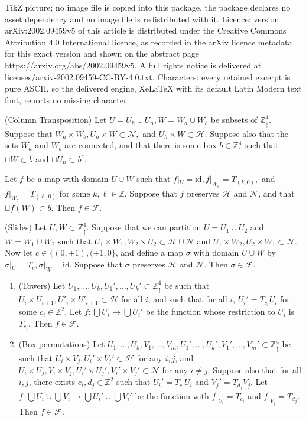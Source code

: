 \documentclass[10pt,a4paper]{amsart}
\newcommand{\X}{\times}
\newcommand{\Zd}{\mathds{Z}^4_\uparrow}
\newcommand{\Z}{\mathds{Z}}
\newcommand{\id}{\text{id}}
\newcommand{\scrF}{\mathcal{F}}
\newcommand{\scrH}{\mathcal{H}}
\newcommand{\scrN}{\mathcal{N}}
\newcommand{\sig}{\sigma}
\newcommand{\sset}{\subset}
\begin{document}
TikZ picture; no image file is copied into this package, the package declares no asset dependency and no image file is redistributed with it. Licence: version arXiv:2002.09459v5 of this article is distributed under the Creative Commons Attribution 4.0 International licence, as recorded in the arXiv licence metadata for this exact version and shown on the abstract page https://arxiv.org/abs/2002.09459v5. A full rights notice is delivered at licenses/arxiv-2002.09459-CC-BY-4.0.txt. Characters: every retained excerpt is pure ASCII, so the delivered engine, XeLaTeX with its default Latin Modern text font, reports no missing character.
\begin{prop}
	\label{P:basic-perm} (Column Transposition)
	Let
	$U = U_h \cup U_n, W = W_a \cup W_b$ be subsets of $\Zd$. Suppose that $W_a \X W_b, U_n \X W \sset \scrN,$ and $U_h \X W \sset \scrH$. Suppose also that the sets $W_a$ and $W_b$ are connected, and that there is some box $b \in \Zd$ such that $\sqcup W \sset b$ and $\sqcup U_n \sset b^c$.
	
	Let $f$ be a map with domain $U \cup W$ such that $f|_U = \id, f|_{W_a} = T_{(k, 0)},$ and $f|_{W_b} = T_{(\ell, 0)}$ for some $k, \ell \in \Z$. Suppose that $f$ preserves $\scrH$ and $\scrN$, and that $\sqcup f(W) \sset b$. Then $f \in \scrF$.
\end{prop}

\begin{prop}
	\label{P:slides} (Slides)
	Let $U, W \sset \Zd$. Suppose that we can partition $U = U_1 \cup U_2$ and $W = W_1 \cup W_2$ such that $U_1 \X W_1, W_2 \X U_2 \sset \scrH \cup \scrN$ and $U_1 \X W_2, U_2 \X W_1 \sset \scrN$. Now let $c \in \{(0, \pm 1), (\pm 1, 0\}$, and define a map $\sig$ with domain $U \cup W$ by  $\sig|_U = T_c, \sig|_W = \id$. Suppose that $\sig$ preserves $\scrH$ and $\scrN$. Then $\sig \in \scrF$.
\end{prop}

\begin{prop}
	\label{P:lie-in-F}
	\begin{enumerate}
		\item (Towers) Let $U_1, \dots, U_k, U_1', \dots, U_k' \sset \Zd$ be such that $U_i \X U_{i+1}, U'_i \X U'_{i+1} \sset \scrH$ for all $i$, and such that for all $i$, $U_i' = T_{c_i} U_i$ for some $c_i \in \Z^2$. Let $f:\bigcup U_i \to \bigcup U_i'$ be the function whose restriction to $U_i$ is $T_{c_i}$. Then $f \in \scrF$. 
		\item (Box permutations) Let $U_1, \dots, U_k, V_1, \dots, V_m, U_1', \dots, U_k', V_1', \dots, V_m' \sset \Zd$ be such that $U_i \X V_j, U_i' \X V_j' \sset \scrH$ for any $i, j$, and $U_i \X U_j, V_i \X V_j, U_i' \X U_j', V_i' \X V_j' \sset \scrN$ for any $i \ne j$. Suppose also that for all $i, j$, there exists $c_i, d_j \in \Z^2$ such that $U_i' = T_{c_i} U_i$ and $V_j' = T_{d_j} V_j$. Let $f:\bigcup U_i \cup \bigcup V_i \to \bigcup U_i' \cup \bigcup V_i'$ be the function with $f|_{U_i} = T_{c_i}$ and $f|_{V_j} = T_{d_j}$. Then $f \in \scrF$.
	\end{enumerate}
\end{prop}
\end{document}
